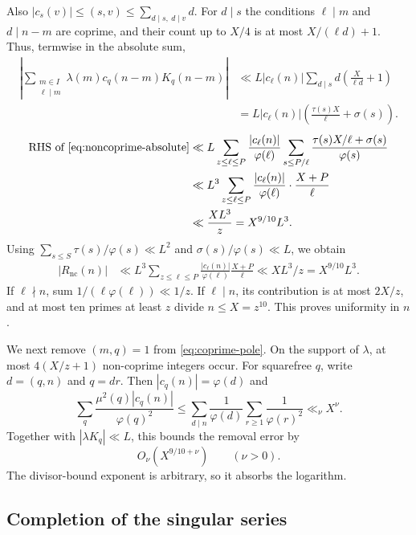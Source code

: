 \documentclass{amsart}
\numberwithin{equation}{section}
\numberwithin{table}{section}
\begin{document}
Also $|c_s(v)|\le(s,v)\le\sum_{d\mid s,\ d\mid v}d$.
For $d\mid s$ the conditions $\ell\mid m$ and $d\mid n-m$ are coprime,
and their count up to $X/4$ is at most $X/(\ell d)+1$.
Thus, termwise in the absolute sum,
\[
\begin{aligned}
\left|\sum_{\substack{m\in I\\\ell\mid m}}
\lambda(m)c_q(n-m)K_q(n-m)\right|
&\ll L|c_\ell(n)|\sum_{d\mid s}d
\left(\frac X{\ell d}+1\right)\\
&=L|c_\ell(n)|
\left(\frac{\tau(s)X}{\ell}+\sigma(s)\right).
\end{aligned}
\]
\[
\begin{aligned}
\text{RHS of \eqref{eq:noncoprime-absolute}}
&\ll L\sum_{z\le\ell\le P}\frac{|c_\ell(n)|}{\varphi(\ell)}
\sum_{s\le P/\ell}\frac{\tau(s)X/\ell+\sigma(s)}{\varphi(s)}\\
&\ll L^3\sum_{z\le\ell\le P}
\frac{|c_\ell(n)|}{\varphi(\ell)}\cdot\frac{X+P}{\ell}\\
&\ll \frac{XL^3}{z}=X^{9/10}L^3.
\end{aligned}
\]
Using $\sum_{s\le S}\tau(s)/\varphi(s)\ll L^2$ and
$\sigma(s)/\varphi(s)\ll L$, we obtain
\begin{align}
|R_{\mathrm{nc}}(n)|
&\ll L^3\sum_{z\le\ell\le P}
\frac{|c_\ell(n)|}{\varphi(\ell)}\frac{X+P}{\ell}
\ll XL^3/z=X^{9/10}L^3.
\label{eq:noncoprime-bound}
\end{align}
If $\ell\nmid n$, sum $1/(\ell\varphi(\ell))\ll1/z$.
If $\ell\mid n$, its contribution is at most $2X/z$, and at most ten
primes at least $z$ divide $n\le X=z^{10}$. This proves uniformity in
$n$.

We next remove $(m,q)=1$ from \eqref{eq:coprime-pole}. On the support of
$\lambda$, at most $4(X/z+1)$ non-coprime integers occur. For squarefree $q$, write $d=(q,n)$ and $q=dr$.
Then $|c_q(n)|=\varphi(d)$ and
\begin{equation}\label{eq:absolute-singular-series}
\sum_q\frac{\mu^2(q)|c_q(n)|}{\varphi(q)^2}
\le\sum_{d\mid n}\frac1{\varphi(d)}\sum_{r\ge1}\frac1{\varphi(r)^2}
\ll_\nu X^\nu.
\end{equation}
Together with $|\lambda K_q|\ll L$, this bounds the removal error by
\begin{equation}\label{eq:remove-coprimality}
O_\nu(X^{9/10+\nu})\qquad(\nu>0).
\end{equation}
The divisor-bound exponent is arbitrary, so it absorbs the logarithm.

\subsection{Completion of the singular series}
\end{document}
